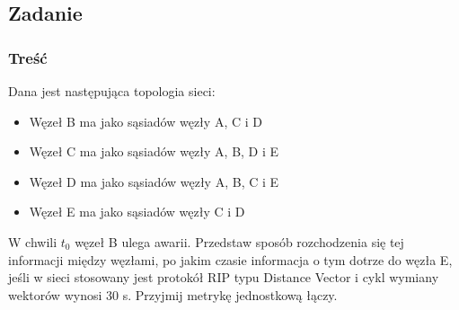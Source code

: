 	\subsection{Zadanie}
		\subsubsection{Treść}
			Dana jest następująca topologia sieci:
			\begin{itemize}
				\item Węzeł B ma jako sąsiadów węzły A, C i D
				\item Węzeł C ma jako sąsiadów węzły A, B, D i E
				\item Węzeł D ma jako sąsiadów węzły A, B, C i E
				\item Węzeł E ma jako sąsiadów węzły C i D
			\end{itemize}
			W chwili $ t_0 $ węzeł B ulega awarii. Przedstaw sposób rozchodzenia się tej informacji między węzłami, po jakim czasie informacja o tym dotrze do węzła E, jeśli w sieci stosowany jest protokół RIP typu Distance Vector i cykl wymiany wektorów wynosi 30 s. Przyjmij metrykę jednostkową łączy.
